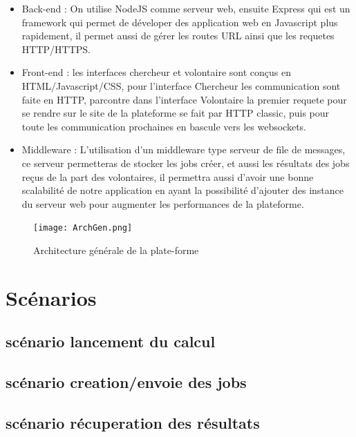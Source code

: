\documentclass[a4paper]{article}
\begin{document}
\begin{itemize}
\item Back-end : On utilise NodeJS comme serveur web, ensuite Express qui est un framework qui permet de déveloper des application web en Javascript plus rapidement, il permet aussi de gérer les routes URL ainsi que les requetes HTTP/HTTPS.
\item Front-end : les interfaces chercheur et volontaire sont conçus en HTML/Javascript/CSS, pour l'interface Chercheur les communication sont faite en HTTP, parcontre dans l'interface Volontaire la premier requete pour se rendre sur le site de la plateforme se fait par HTTP classic, puis pour toute les communication prochaines en bascule vers les websockets.
\item Middleware : L'utilisation d'un middleware type serveur de file de messages, ce serveur permetteras de stocker les jobs créer, et aussi les résultats des jobs reçus de la part des volontaires, il permettra aussi d'avoir une bonne scalabilité de notre application en ayant la possibilité d'ajouter des instance du serveur web pour augmenter les performances de la plateforme.
\end{itemize} 

\begin{figure}[h]
\centering
\texttt{[image: ArchGen.png]}
\caption{\label{fig:ArchGenarale}Architecture générale de la plate-forme}
\end{figure}

\section{Scénarios}
\subsection{scénario lancement du calcul}

\subsection{scénario creation/envoie des jobs}
\subsection{scénario récuperation des résultats}
\end{document}
